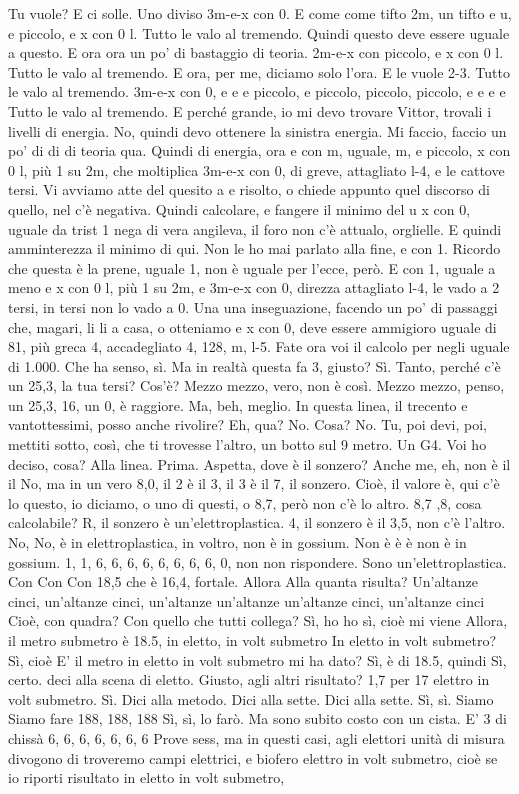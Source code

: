 \begin{soluzione}
   Tu vuole? E ci solle. Uno diviso 3m-e-x con 0. E come come tifto 2m, un tifto e u, e piccolo, e x con 0 l. Tutto le valo al tremendo. Quindi questo deve essere uguale a questo. E ora ora un po' di bastaggio di teoria. 2m-e-x con piccolo, e x con 0 l. Tutto le valo al tremendo. E ora, per me, diciamo solo l'ora. E le vuole 2-3. Tutto le valo al tremendo. 3m-e-x con 0, e e e piccolo, e piccolo, piccolo, piccolo, e e e e Tutto le valo al tremendo. E perché grande, io mi devo trovare Vittor, trovali i livelli di energia. No, quindi devo ottenere la sinistra energia. Mi faccio, faccio un po' di di di teoria qua. Quindi di energia, ora e con m, uguale, m, e piccolo, x con 0 l, più 1 su 2m, che moltiplica 3m-e-x con 0, di greve, attagliato l-4, e le cattove tersi. Vi avviamo atte del quesito a e risolto, o chiede appunto quel discorso di quello, nel c'è negativa. Quindi calcolare, e fangere il minimo del u x con 0, uguale da trist 1 nega di vera angileva, il foro non c'è attualo, orglielle. E quindi amminterezza il minimo di qui. Non le ho mai parlato alla fine, e con 1. Ricordo che questa è la prene, uguale 1, non è uguale per l'ecce, però. E con 1, uguale a meno e x con 0 l, più 1 su 2m, e 3m-e-x con 0, direzza attagliato l-4, le vado a 2 tersi, in tersi non lo vado a 0. Una una inseguazione, facendo un po' di passaggi che, magari, li li a casa, o otteniamo e x con 0, deve essere ammigioro uguale di 81, più greca 4, accadegliato 4, 128, m, l-5. Fate ora voi il calcolo per negli uguale di 1.000. Che ha senso, sì. Ma in realtà questa fa 3, giusto? Sì. Tanto, perché c'è un 25,3, la tua tersi? Cos'è? Mezzo mezzo, vero, non è così. Mezzo mezzo, penso, un 25,3, 16, un 0, è raggiore. Ma, beh, meglio. In questa linea, il trecento e vantottessimi, posso anche rivolire? Eh, qua? No. Cosa? No. Tu, poi devi, poi, mettiti sotto, così, che ti trovesse l'altro, un botto sul 9 metro. Un G4. Voi ho deciso, cosa? Alla linea. Prima. Aspetta, dove è il sonzero? Anche me, eh, non è il il No, ma in un vero 8,0, il 2 è il 3, il 3 è il 7, il sonzero. Cioè, il valore è, qui c'è lo questo, io diciamo, o uno di questi, o 8,7, però non c'è lo altro. 8,7 ,8, cosa calcolabile? R, il sonzero è un'elettroplastica. 4, il sonzero è il 3,5, non c'è l'altro. No, No, è in elettroplastica, in voltro, non è in gossium. Non è è è non è in gossium. 1, 1, 6, 6, 6, 6, 6, 6, 6, 6, 0, non non rispondere. Sono un'elettroplastica. Con Con Con 18,5 che è 16,4, fortale. Allora Alla quanta risulta? Un'altanze cinci, un'altanze cinci, un'altanze un'altanze un'altanze cinci, un'altanze cinci Cioè, con quadra? Con quello che tutti collega? Sì, ho ho sì, cioè mi viene Allora, il metro submetro è 18.5, in eletto, in volt submetro In eletto in volt submetro? Sì, cioè E' il metro in eletto in volt submetro mi ha dato? Sì, è di 18.5, quindi Sì, certo. deci alla scena di eletto. Giusto, agli altri risultato? 1,7 per 17 elettro in volt submetro. Sì. Dici alla metodo. Dici alla sette. Dici alla sette. Sì, sì. Siamo Siamo fare 188, 188, 188 Sì, sì, lo farò. Ma sono subito costo con un cista. E' 3 di chissà 6, 6, 6, 6, 6, 6, 6 Prove sess, ma in questi casi, agli elettori unità di misura divogono di troveremo campi elettrici, e biofero elettro in volt submetro, cioè se io riporti risultato in eletto in volt submetro, 
\end{soluzione}
